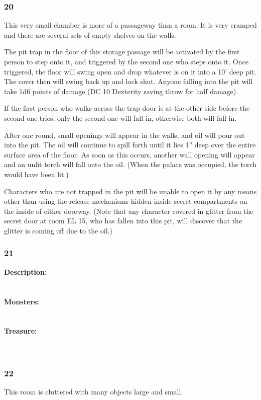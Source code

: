 \documentclass[palace_of_the_silver_princess]{subfiles}
\begin{document}
\subsubsection{20}
\begin{quotebox}
    This very small chamber is more of a passageway than a room. It is
    very cramped and there are several sets of empty shelves on the
    walls.
\end{quotebox}

The pit trap in the floor of this storage passage will be activated by
the first person to step onto it, and triggered by the second one who
steps onto it. Once triggered, the floor will swing open and drop
whatever is on it into a 10’ deep pit. The cover then will swing back up
and lock shut. Anyone falling into the pit will take 1d6 points of
damage (DC 10 Dexterity saving throw for half damage).

If the first person who walks across the trap door is at the other side
before the second one tries, only the second one will fall in, otherwise
both will fall in.

After one round, small openings will appear in the walls, and
oil will pour out into the pit. The oil will continue to spill forth
until it lies 1” deep over the entire surface area of the floor. As
soon as this occurs, another wall opening will appear and an unlit torch
will fall onto the oil. (When the palace was occupied, the torch would
have been lit.)

Characters who are not trapped in the pit will be unable to open it by
any means other than using the release mechanisms hidden inside secret
compartments on the inside of either doorway. (Note that any character
covered in glitter from the secret door at room EL 15, who has fallen
into this pit, will discover that the glitter is coming off due to the
oil.)

\subsubsection{21}
\textbf{Description:}
\\
\\
\\
\textbf{Monsters:}
\\
\\
\\
\textbf{Treasure:}
\\
\\
\\

\subsubsection{22}
\begin{quotebox}
    This room is cluttered with many objects large and small.
\end{quotebox}
\end{document}
